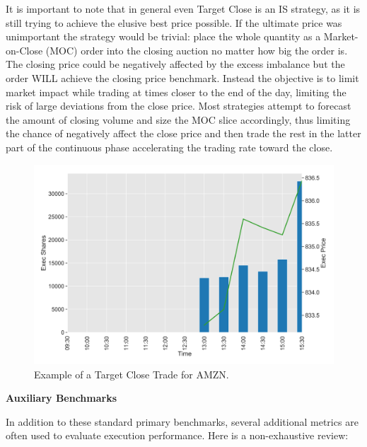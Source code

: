 It is important to note that in general even Target Close is an IS strategy, as it is still trying to achieve the elusive best price possible. If the ultimate price was unimportant the strategy would be trivial: place the whole quantity as a Market-on-Close (MOC) order into the closing auction no matter how big the order is. The closing price could be negatively affected by the excess imbalance but the order WILL achieve the closing price benchmark. Instead the objective is to limit market impact while trading at times closer to the end of the day, limiting the risk of large deviations from the close price. Most strategies attempt to forecast the amount of closing volume and size the MOC slice accordingly, thus limiting the chance of negatively affect the close price and then trade the rest in the latter part of the continuous phase accelerating the trading rate toward the close. \twomedskip

	\begin{figure}[!ht]
	\centering
	\includegraphics[width=\textwidth]{chapters/chapter_exec_models/figures/close.png} 
	\caption{Example of a Target Close Trade for AMZN.\label{fig:close}}
	\end{figure}


\noindent\textbf{Auxiliary Benchmarks} \twomedskip


In addition to these standard primary benchmarks, several additional metrics are often used to evaluate execution performance. Here is a non-exhaustive review:


